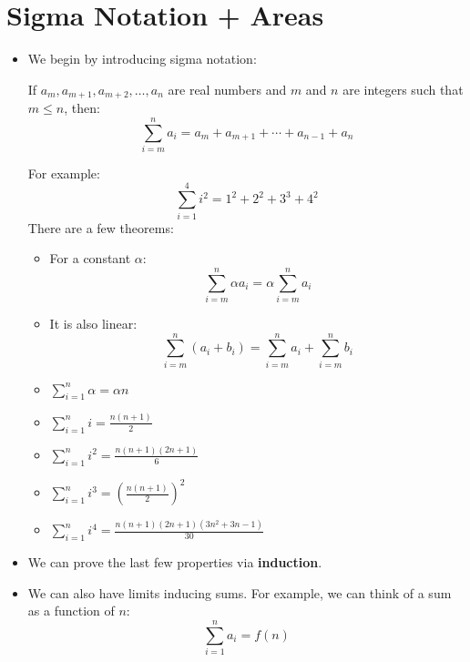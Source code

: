 \section{Sigma Notation + Areas}
\begin{itemize}
    \item We begin by introducing sigma notation:
    \begin{definition}
        If $a_m,a_{m+1},a_{m+2},\dots,a_n$ are real numbers and $m$ and $n$ are integers such that $m\le n$, then:
        \begin{equation}
            \sum_{i=m}^{n}a_i=a_m+a_{m+1}+\cdots+a_{n-1}+a_n
            \label{eq:}
        \end{equation}
    \end{definition}
    For example:
    \begin{equation}
        \sum_{i=1}^4 i^2 = 1^2+2^2+3^3+4^2
        \label{eq:}
    \end{equation}
    There are a few theorems:
    \begin{itemize}
        \item For a constant $\alpha$:
        \begin{equation}
            \sum_{i=m}^n \alpha a_i = \alpha\sum_{i=m}^n a_i
            \label{eq:}
        \end{equation}
        \item It is also linear:
        \begin{equation}
            \sum_{i=m}^n (a_i+b_i) = \sum_{i=m}^na_i + \sum_{i=m}^nb_i
            \label{eq:}
        \end{equation}
        \item $\sum_{i=1}^n \alpha = \alpha n$
        \item $\sum_{i=1}^n i = \frac{n(n+1)}{2}$
        \item $\sum_{i=1}^n i^2 = \frac{n(n+1)(2n+1)}{6}$
        \item $\sum_{i=1}^n i^3 = \left(\frac{n(n+1)}{2}\right)^2$
        \item $\sum_{i=1}^n i^4 = \frac{n(n+1)(2n+1)(3n^2+3n-1)}{30}$
    \end{itemize}
    \item We can prove the last few properties via \textbf{induction}.
    \item We can also have limits inducing sums. For example, we can think of a sum as a function of $n$:
    \begin{equation}
        \sum_{i=1}^n a_i = f(n)
        \label{eq:}
    \end{equation}

\end{itemize}
